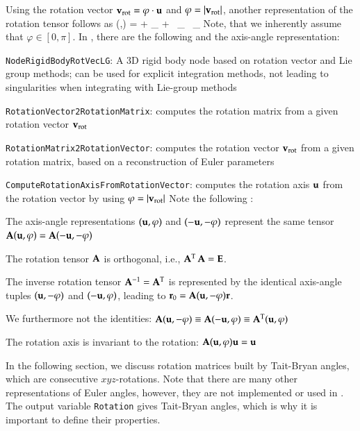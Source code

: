 %
Using the rotation vector $\mathbf{v}_\mathrm{rot} = \varphi\cdot \mathbf{u}$ and $\varphi = |\mathbf{v}_\mathrm{rot}|$, another representation of the rotation tensor follows as
\be 
  \Rot(\uv ,\varphi) =  \Im + \frac{\sin \varphi}{\varphi} \tilde\vv_ +  \,  \tilde\vv_ \, \tilde\vv_
\ee
Note, that we inherently assume that $\varphi \in [0,\pi]$.
%
\noindent In \codeName, there are the following  and the axis-angle representation:
\bi
  \item \texttt{NodeRigidBodyRotVecLG}: A 3D rigid body node based on rotation vector and Lie group methods; can be used for explicit integration methods, not leading to singularities when integrating with Lie-group methods
  \item \texttt{RotationVector2RotationMatrix}: computes the rotation matrix from a given rotation vector $\mathbf{v}_\mathrm{rot}$
  \item \texttt{RotationMatrix2RotationVector}: computes the rotation vector $\mathbf{v}_\mathrm{rot}$ from a given rotation matrix, based on a reconstruction of Euler parameters
  \item \texttt{ComputeRotationAxisFromRotationVector}: computes the rotation axis $\mathbf{u}$ from the rotation vector by using $\varphi = |\mathbf{v}_\mathrm{rot}|$
\ei
%
Note the following :
\bi
  \item The axis-angle representations $(\mathbf{u}, \varphi)$ and $(-\mathbf{u}, -\varphi)$ represent the same tensor $\mathbf{A}(\mathbf{u},\varphi)=\mathbf{A}(-\mathbf{u},-\varphi)$
  \item The rotation tensor $\mathbf{A}$ is orthogonal, i.e., $\mathbf{A}^\mathrm{T} \, \mathbf{A} = \mathbf{E}$. 
  \item The inverse rotation tensor $\mathbf{A}^{-1} = \mathbf{A}^\mathrm{T}$ is represented by the identical axis-angle tuples $(\mathbf{u}, -\varphi)$ and $(-\mathbf{u}, \varphi)$, leading to $\mathbf{r}_0=\mathbf{A}(\mathbf{u}, -\varphi) \mathbf{r}$.
  \item We furthermore not the identities: $\mathbf{A}(\mathbf{u}, -\varphi) \equiv \mathbf{A}(-\mathbf{u}, \varphi) \equiv \mathbf{A}^\mathrm{T} (\mathbf{u}, \varphi)$
  \item The rotation axis is invariant to the rotation: $\mathbf{A}(\mathbf{u}, \varphi) \mathbf{u} = \mathbf{u}$
\ei


In the following section, we discuss rotation matrices built by Tait-Bryan angles, which are consecutive $xyz$-rotations.
Note that there are many other representations of Euler angles, however, they are not implemented or used in \codeName.
The output variable \texttt{Rotation} gives Tait-Bryan angles, which is why it is important to define their properties.

